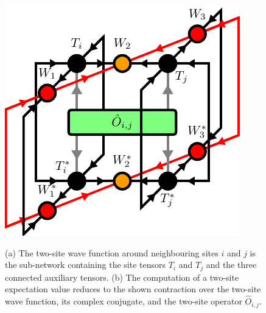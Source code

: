 \begin{figure}
	\centering
	\subcaptionbox{\label{fig:YB_isoTPS_twosite_expectation_value_environment}}
	{%
		\usebox{\largestimage}
	}
	\quad\quad
	\subcaptionbox{\label{fig:YB_isoTPS_twosite_expectation_value_computation}}
	{%
		\raisebox{\dimexpr.5\ht\largestimage-.5\height}
		{%
			\includegraphics[scale=1.0]{figures/tikz/YB_isoTPS/two_site_expectation_value/two_site_expectation_value_b.pdf}
		}
	}
	\caption{(a) The two-site wave function around neighbouring sites $i$ and $j$ is the sub-network containing the site tensors $T_i$ and $T_j$ and the three connected auxiliary tensors. (b) The computation of a two-site expectation value reduces to the shown contraction over the two-site wave function, its complex conjugate, and the two-site operator $\hat{O}_{i,j}$.}
	\label{fig:YB_isoTPS_twosite_expectation_value}
\end{figure}
